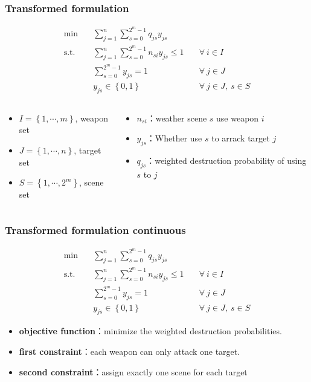 \documentclass[CJK,10pt]{beamer}
\newcommand{\sumFromTo}[3]{\ensuremath{\sum_{#1}^{#2} #3}}
\newcommand{\optimalProblem}[3]
{\begin{align*}
    #1 \quad &#2 \\
    \mathrm{s. t.}\quad&#3
\end{align*}}
\begin{document}
\begin{frame}
    \frametitle{Transformed formulation}
    \optimalProblem{\min}{\sumFromTo{j = 1}{n}{\sumFromTo{s = 0}{2^m -1}{q_{js}y_{js}}}\tag{CG}}{\sumFromTo{j = 1}{n}{\sumFromTo{s = 0}{2^m -1}{n_{si}y_{js}}}\leq 1 \quad &\forall ~ i \in I\\& \sumFromTo{s = 0}{2^m - 1}{y_{js}} = 1 \quad &\forall ~ j \in J\\& y_{js} \in \left\{ 0,1 \right\} &\forall ~ j\in J,\ s\in S}
    \begin{columns}
        \begin{column}{.55\linewidth}
            \footnotesize
            \begin{itemize}
                \item $I = \left\{1,\cdots,m\right\} $, weapon set
                \item $J = \left\{1,\cdots,n\right\} $, target set
                \item $S = \left\{1,\cdots,2^m\right\}$, scene set
            \end{itemize}
        \end{column}
    \hspace{-3cm}
        \begin{column}{.55\linewidth}
            \footnotesize
            \begin{itemize}
                \item $n_{si}$：weather scene $s$ use weapon $i$
                \item $y_{js}$：Whether use $s$ to arrack target $j$
                \item $q_{js}$：weighted destruction probability of using $s$ to $j$
            \end{itemize}
        \end{column}
    \end{columns}
\end{frame}

\begin{frame}
    \frametitle{Transformed formulation continuous}
    \optimalProblem{\min}{\sumFromTo{j = 1}{n}{\sumFromTo{s = 0}{2^m -1}{q_{js}y_{js}}}\tag{CG}}{\sumFromTo{j = 1}{n}{\sumFromTo{s = 0}{2^m -1}{n_{si}y_{js}}}\leq 1 \quad &\forall ~ i \in I\\& \sumFromTo{s = 0}{2^m - 1}{y_{js}} = 1 \quad &\forall ~ j \in J\\& y_{js} \in \left\{ 0,1 \right\} & \forall ~ j\in J,\ s\in S}
    \begin{itemize}
        \item \textbf{objective function}：minimize the weighted destruction probabilities.
        \item \textbf{first constraint}：each weapon can only attack one target.
        \item \textbf{second constraint}：assign exactly one scene for each target
    \end{itemize}
\end{frame}
\end{document}
